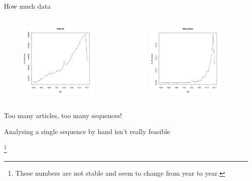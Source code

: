 \documentclass[pdf]{beamer}
\newcommand\blfootnote[1]{%
  \begingroup  %
  \renewcommand\thefootnote{}\footnote{#1}%
  \addtocounter{footnote}{-1}  %
  \endgroup
}
\begin{document}
\begin{frame}{How much data}
  \begin{columns}
    \begin{column}{0.5\textwidth}
      \begin{figure}[ht]
        \includegraphics[width=0.9\textwidth]{images/article_counts}
      \end{figure}
    \end{column}
    \pause
    \begin{column}{0.5\textwidth}
      \begin{figure}[ht]
        \includegraphics[width=0.9\textwidth]{images/nucleotide_counts}
      \end{figure}
    \end{column}
  \end{columns}
  {\small
    Too many articles, too many sequences!
    \par
    Analysing a single sequence by hand isn't really feasible
  }
  \blfootnote{These numbers are not stable and seem to change from year to year.}
\end{frame}
\end{document}
